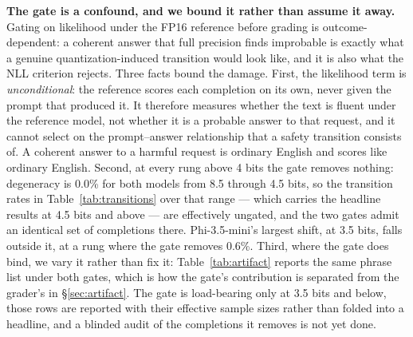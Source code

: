 \documentclass[11pt,a4paper]{article}
\begin{document}
\begin{caveatbox}
\textbf{The gate is a confound, and we bound it rather than assume it away.}
Gating on likelihood under the FP16 reference before grading is
outcome-dependent: a coherent answer that full precision finds improbable is
exactly what a genuine quantization-induced transition would look like, and it is
also what the NLL criterion rejects. Three facts bound the damage. First, the likelihood term is
\emph{unconditional}: the reference scores each completion on its own, never
given the prompt that produced it. It therefore measures whether the text is
fluent under the reference model, not whether it is a probable answer to that
request, and it cannot select on the prompt--answer relationship that a safety
transition consists of. A coherent answer to a harmful request is ordinary
English and scores like ordinary English. Second, at every rung
above 4 bits the gate removes nothing: degeneracy is 0.0\% for both models from
8.5 through 4.5 bits, so the transition rates in Table~\ref{tab:transitions} over
that range --- which carries the headline results at 4.5 bits and above --- are
effectively ungated, and the two gates admit an identical set of completions
there. Phi-3.5-mini's largest shift, at 3.5 bits, falls outside it, at a rung
where the gate removes 0.6\%. Third,
where the gate does bind, we vary it rather than fix it:
Table~\ref{tab:artifact} reports the same phrase list under both gates, which is
how the gate's contribution is separated from the grader's in
\S\ref{sec:artifact}. The gate is load-bearing only at 3.5 bits and below, those
rows are reported with their effective sample sizes rather than folded into a
headline, and a blinded audit of the completions it removes is not yet done.
\end{caveatbox}
\end{document}

